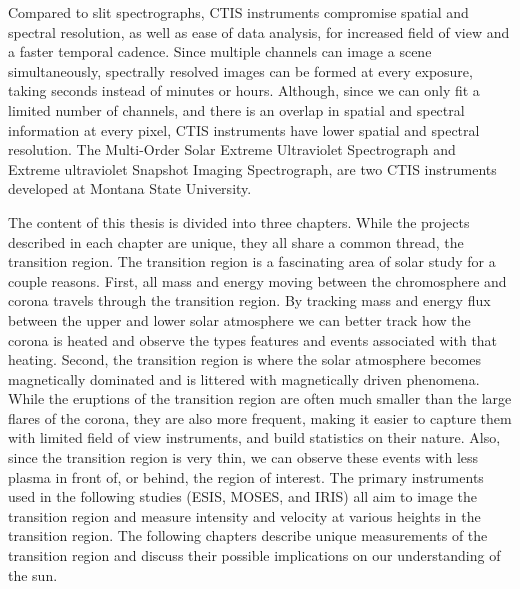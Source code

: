 Compared to slit spectrographs, CTIS instruments compromise spatial and spectral resolution, as well as ease of data analysis, for increased field of view and a faster temporal cadence.
Since multiple channels can image a scene simultaneously, spectrally resolved images can be formed at every exposure, taking seconds instead of minutes or hours.
Although, since we can only fit a limited number of channels, and there is an overlap in spatial and spectral information at every pixel, CTIS instruments have lower spatial and spectral resolution. 
The Multi-Order Solar Extreme Ultraviolet Spectrograph \citep[MOSES:{}][]{Fox2010} and Extreme ultraviolet Snapshot Imaging Spectrograph\citep[ESIS:][]{ESIS}, are two CTIS instruments developed at Montana State University.

The content of this thesis is divided into three chapters.  
While the projects described in each chapter are unique, they all share a common thread, the transition region.
The transition region is a fascinating area of solar study for a couple reasons.
First, all mass and energy moving between the chromosphere and corona travels through the transition region.
By tracking mass and energy flux between the upper and lower solar atmosphere we can better track how the corona is heated and observe the types features and events associated with that heating.
Second, the transition region is where the solar atmosphere becomes magnetically dominated and is littered with magnetically driven phenomena.
While the eruptions of the transition region are often much smaller than the large flares of the corona, they are also more frequent, making it easier to capture them with limited field of view instruments, and build statistics on their nature.
Also, since the transition region is very thin, we can observe these events with less plasma in front of, or behind, the region of interest.
The primary instruments used in the following studies (ESIS, MOSES, and IRIS) all aim to image the transition region and measure intensity and velocity at various heights in the transition region.
The following chapters describe unique measurements of the transition region and discuss their possible implications on our understanding of the sun.

